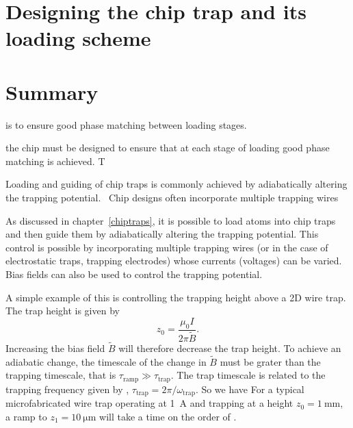 \section{Designing the chip trap and its loading scheme}

\section{Summary}


 is to ensure good phase matching
between loading stages.


 the chip must be designed to ensure that at each stage
of loading good phase matching is achieved. T





Loading and guiding of chip traps is commonly achieved by adiabatically
altering the trapping potential.~\cite{} Chip designs often incorporate
multiple trapping wires

As discussed in chapter~\ref{chiptraps}, it is possible to load atoms into
chip traps and then guide them by adiabatically altering the trapping
potential.  This control is possible by
incorporating multiple trapping wires (or in the case of electrostatic traps,
trapping electrodes) whose currents (voltages) can be 
varied. Bias fields can also be used to control the trapping potential.

A simple example of this is controlling the trapping height above a 2D wire
trap. The trap height is given by 
%
\begin{equation}
z_0 = \frac{\mu_0I}{2\pi \tilde{B}}.
\end{equation}
%
Increasing the bias field $\tilde{B}$ will therefore decrease the trap height.
To achieve an adiabatic change, the timescale of the change in $\tilde{B}$ must
be grater than the trapping timescale, that is $\tau_\text{ramp} \gg
\tau_\text{trap}$. The trap timescale is related to the trapping frequency
given by , $\tau_\text{trap} = 2\pi / \omega_\text{trap}$. So
we have
%
%
For a typical microfabricated wire trap operating at \SI{1}{\ampere} and trapping
at a height $z_0 = \SI{1}{\milli\meter}$, a ramp to $z_1 =
\SI{10}{\micro\meter}$ will take a time on the order of .


